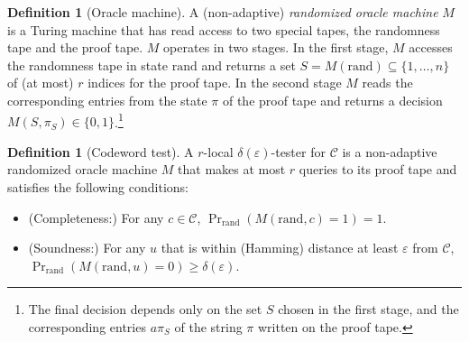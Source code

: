 \documentclass[11pt]{article}
\theoremstyle{definition}
\newtheorem{definition}[theorem]{Definition}
\newcommand{\code}{\mathcal{C}}
\newcommand{\field}{\mathbb{F}}
\newcommand{\N}{\ensuremath{\mathbb{N}}}
\newcommand{\mM}{\ensuremath{\mathcal{M}}}
\newcommand{\ind}{\ensuremath{\mathrm{ind}}}
\newcommand{\rand}{\textrm{rand}}
\newcommand{\eps}{\varepsilon}
\begin{document}

\begin{definition}[Oracle machine]
A (non-adaptive) \emph{randomized oracle machine} $M$ is a Turing machine that has read access to two special tapes, the randomness tape and the proof tape. $M$ operates in two stages. In the first stage, $M$ accesses the randomness tape in state $\rand$ and returns a set $S=M(\rand)\subseteq\{1,\ldots,n\}$ of (at most) $r$ indices for the proof tape. In the second stage $M$ reads the corresponding entries from the state $\pi$ of the proof tape and returns a decision $M(S,\pi_S)\in\{0,1\}$.\footnote{The final decision depends only on the set $S$ chosen in the first stage, and the corresponding entries $a\pi_S$ of the string $\pi$ written on the proof tape.} %
\end{definition}

\begin{definition}[Codeword test]
A $r$-local $\delta(\eps)$-tester for $\code$ is a non-adaptive randomized oracle machine $M$ that makes at most $r$ queries to its proof tape and satisfies the following conditions:
\begin{itemize} 
\item (Completeness:) For any $c\in \code$, $\Pr_\rand( M(\rand,c)=1)=1$.
\item (Soundness:) For any $u$ that is within (Hamming) distance at least  $\eps$ from $\code$, $\Pr_\rand(M(\rand,u)=0)\geq \delta(\eps)$. 
\end{itemize}
\end{definition}

\end{document}
